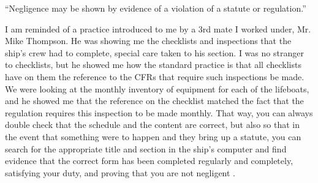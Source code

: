 
\date{Admiralty Law -- 10 February 2024}


\begin{flushleft}
\thetitle

\thedate

\theauthor
\end{flushleft}

``Negligence may be shown by evidence of a violation of a statute or regulation.''  %

I am reminded of a practice introduced to me by a 3rd mate I worked under, Mr. Mike Thompson.
He was showing me the checklists and inspections that the ship’s crew had to complete, special care taken to his section.
I was no stranger to checklists, but he showed me how the standard practice is that all checklists have on them the reference to the CFRs that require such inspections be made.
We were looking at the monthly inventory of equipment for each of the lifeboats, and he showed me that the reference on the checklist matched the fact that the regulation requires this inspection to be made monthly.
That way, you can always double check that the schedule and the content are correct, but also so that in the event that something were to happen and they bring up a statute, you can search for the appropriate title and section in the ship’s computer and find evidence that the correct form has been completed regularly and completely, satisfying your duty, and proving that you are not negligent
.
